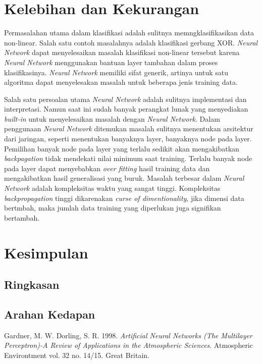 \section{Kelebihan dan Kekurangan}
Permasalahan utama dalam klasifikasi adalah sulitnya memngklasifikasikan data non-linear. 
Salah satu contoh masalahnya adalah klasifikasi gerbang XOR. 
\textit{Neural Network} dapat menyelesaikan masalah klasifikasi non-linear tersebut karena \textit{Neural Network} menggunakan bantuan layer tambahan dalam proses klasifikasinya.
\textit{Neural Network} memiliki sifat generik, artinya untuk satu algoritma dapat menyelesakan masalah untuk beberapa jenis training data.

Salah satu persoalan utama \textit{Neural Network} adalah sulitnya implementasi dan interpretasi. 
Namun saat ini sudah banyak perangkat lunak yang menyediakan \textit{built-in} untuk menyelesaikan masalah dengan \textit{Neural Network}.
Dalam penggunaan \textit{Neural Network} ditemukan masalah sulitnya menentukan arsitektur dari jaringan, seperti menentukan banyaknya layer, banyaknya node pada layer.
Pemilihan banyak node pada layer yang terlalu sedikit akan mengakibatkan \textit{backpagation} tidak mendekati nilai minimum saat training.
Terlalu banyak node pada layer dapat menyebabkan \textit{over fitting} hasil training data dan mengakibatkan hasil generalisasi yang buruk.
Masalah terbesar dalam \textit{Neural Network} adalah kompleksitas waktu yang sangat tinggi. 
Kompleksitas \textit{backpropagation} tinggi dikarenakan \textit{curse of dimentionality}, jika dimensi data bertmbah, maka jumlah data training yang diperlukan juga signifikan bertambah.


\section{Kesimpulan}

	\subsection{Ringkasan}
	\lipsum

	\subsection{Arahan Kedapan}
	\lipsum[1]

Gardner, M. W. Dorling, S. R. 1998. \textit{Artificial Neural Networks (The Multilayer Perceptron)-A Review of Applications in the Atmospheric Sciences}. Atmospheric Environtment vol. 32 no. 14/15. Great Britain.  
